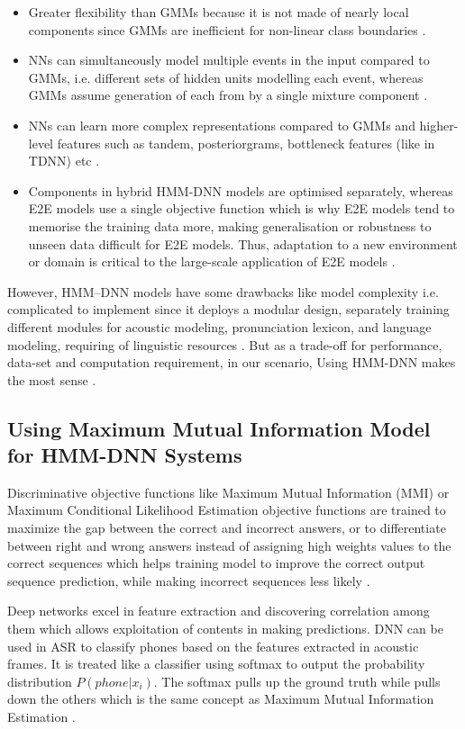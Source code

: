 \begin{itemize}
    \item Greater flexibility than GMMs because it is not made of nearly local components since GMMs are inefficient for non-linear class boundaries \cite{bell_adaptation_2021}.
    \item NNs can simultaneously model multiple events in the input compared to GMMs, i.e. different sets of hidden units modelling each event, whereas GMMs assume generation of each from by a single mixture component \cite{hussein_arabic_2022}.
    \item NNs can learn more complex representations compared to GMMs and higher-level features such as tandem, posteriorgrams, bottleneck features (like in TDNN) etc \cite{liu_time_2019}.
    \item Components in hybrid HMM-DNN models are optimised separately, whereas E2E models use a single objective function which is why E2E models tend to memorise the training data more, making generalisation or robustness to unseen data difficult for E2E models. Thus, adaptation to a new environment or domain is critical to the large-scale application of E2E models \cite{backstrom_introduction_2022}. 
\end{itemize}

However, HMM–DNN models have some drawbacks like model complexity i.e. complicated to implement since it deploys a modular design, separately training different modules for acoustic modeling, pronunciation lexicon, and language modeling,  requiring of linguistic resources \cite{hussein_arabic_2022}. But as a trade-off for performance, data-set and computation requirement, in our scenario, Using HMM-DNN makes the most sense \cite{georgescu_performance_2021}.

\subsection{Using Maximum Mutual Information Model for HMM-DNN Systems}

Discriminative objective functions like Maximum Mutual Information (MMI) or Maximum Conditional Likelihood Estimation objective functions are trained to maximize the gap between the correct and incorrect answers, or to differentiate between right and wrong answers instead of assigning high weights values to the correct sequences which helps training model to improve the correct output sequence prediction, while making incorrect sequences less likely \cite{povey_purely_2016}. 

Deep networks excel in feature extraction and discovering correlation among them which allows exploitation of contents in making predictions. DNN can be used in ASR to classify phones based on the features extracted in acoustic frames. It is treated like a classifier using softmax to output the probability distribution $P(phone | x_{i})$. The softmax pulls up the ground truth while pulls down the others which is the same concept as Maximum Mutual Information Estimation \cite{wiesner_lattice_2020}.

